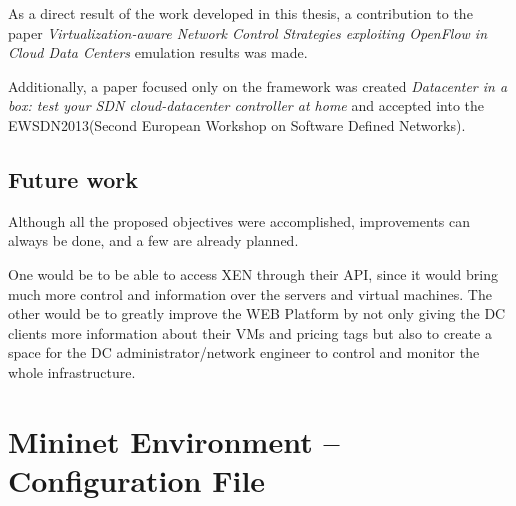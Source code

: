 \documentclass[12pt,english,oneside]{book}
\begin{document}
As a direct result of the work developed in this thesis, a contribution to the paper \textit{Virtualization-aware Network Control Strategies exploiting OpenFlow in Cloud Data Centers}\cite{im2013} emulation results was made.

Additionally, a paper focused only on the framework was created \textit{Datacenter in a box: test your SDN cloud-datacenter controller at home} and accepted into the EWSDN2013(Second European Workshop on Software Defined Networks)\cite{ewsdn}.


\section{Future work}

Although all the proposed objectives were accomplished, improvements can always be done, and a few are already planned.

One would be to be able to access XEN through their API, since it would bring much more control and information over the servers and virtual machines.
The other would be to greatly improve the WEB Platform by not only giving the DC clients more information about their VMs and pricing tags but also to create a space for the DC administrator/network engineer to control and monitor the whole infrastructure.

\appendix

\chapter{Mininet Environment -- Configuration File\label{app:minconf}}
\end{document}
